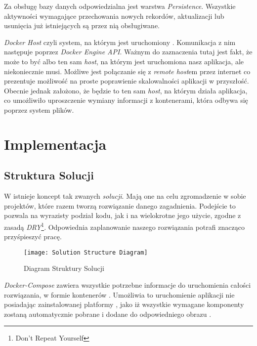 \par Za obsługę bazy danych odpowiedzialna jest warstwa \emph{Persistence}. Wszystkie aktywności wymagające przechowania nowych rekordów, aktualizacji lub usunięcia już istniejących są przez nią obsługiwane.

\par \emph{Docker Host} czyli system, na którym jest uruchomiony \emph{\docker{}}. Komunikacja z nim następuje poprzez \emph{Docker Engine API}. Ważnym do zaznaczenia tutaj jest fakt, że może to być albo ten sam \emph{host}, na którym jest uruchomiona nasz aplikacja, ale niekoniecznie musi. Możliwe jest połączanie się z \emph{remote host}em przez internet co prezentuje możliwość na proste poprawienie skalowalności aplikacji w przyszłość. Obecnie jednak założono, że będzie to ten sam \emph{host}, na którym działa aplikacja, co umożliwiło uproszczenie wymiany informacji z kontenerami, która odbywa się poprzez system plików.

\section{Implementacja}

\subsection{Struktura Solucji}

\par W \emph{\dotnet{}} istnieje koncept tak zwanych \emph{solucji}. Mają one na celu zgromadzenie w sobie projektów, które razem tworzą rozwiązanie danego zagadnienia. Podejście to pozwala na wyrazisty podział kodu, jak i na wielokrotne jego użycie, zgodne z zasadą \emph{DRY}\footnote{Don't Repeat Yourself}. Odpowiednia zaplanowanie naszego rozwiązania potrafi znacząco przyśpieszyć pracę.

\begin{figure}
	\texttt{[image: Solution Structure Diagram]}
	\caption{Diagram Struktury Solucji}
	\label{fig:solutionStructureDiagram}
\end{figure}

\par \emph{Docker-Compose} zawiera wszystkie potrzebne informacje do uruchomienia całości rozwiązania, w formie kontenerów \emph{\docker{}}. Umożliwia to uruchomienie aplikacji nie posiadając zainstalowanej platformy \emph{\dotnet{}}, jako iż wszystkie wymagane komponenty zostaną automatycznie pobrane i dodane do odpowiedniego obrazu \emph{\docker{}}.

